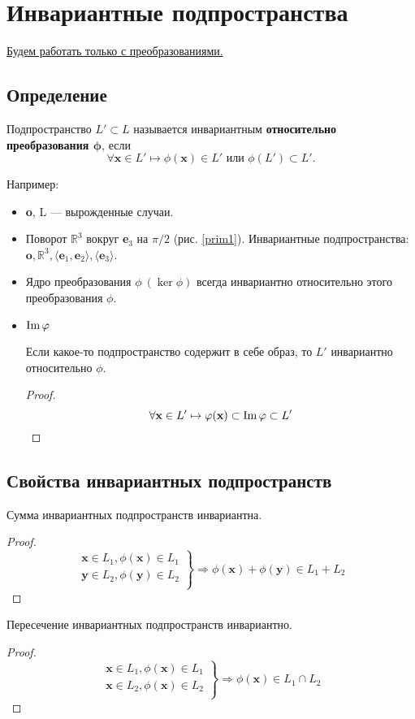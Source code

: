 \section{Инвариантные подпространства}
\underline{Будем работать только с преобразованиями.} %
\subsection{Определение}
\begin{definition}
Подпространство $L' \subset L$ называется \textsf{инвариантным} \textbf{относительно преобразования $\bm\phi$}, если
$$
\forall \textbf{x} \in L' \mapsto \phi(\textbf{x}) \in L'\text{ или }\phi(L')\subset L'.
$$
\end{definition}
Например:
\begin{itemize}
	\item \textbf{o}, L --- вырожденные случаи.
	\item Поворот $\mathbb{R}^3$ вокруг \textbf{e$_3$} на $\pi/2$ (рис. \ref{prim1}). Инвариантные подпространства: $\textbf{o}, \mathbb{R}^3, \langle \textbf{e$_1$}, \textbf{e$_2$} \rangle, \langle \textbf{e$_3$}\rangle$.
	\item Ядро преобразования $\phi \ (\ker \phi)$ всегда инвариантно относительно этого преобразования $\phi$.
	\item $\operatorname{\mathop{Im}} \varphi$
	\begin{theorem}
	Если какое-то подпространство содержит в себе образ, то $L'$ инвариантно относительно $\phi$.
	\end{theorem}
	\begin{proof}
		$$\forall \textbf{x} \in L' \mapsto \varphi(\textbf{x}) \subset \operatorname{\mathop{Im}}\varphi\subset L'$$
	\end{proof}
\end{itemize}
\subsection{Свойства инвариантных подпространств}
\begin{predlog}
	Сумма инвариантных подпространств инвариантна.
\end{predlog}
\begin{proof}
	$$
	\left.
	\begin{array}{r}
		\textbf{x} \in L_1, \phi(\textbf{x}) \in L_1\\
		\textbf{y} \in L_2, \phi(\textbf{y}) \in L_2\\
	\end{array}
	\right\} \Rightarrow \phi(\textbf{x}) + \phi(\textbf{y}) \in L_1 + L_2
	$$
\end{proof}
\begin{predlog}
	Пересечение инвариантных подпространств инвариантно.
\end{predlog}
\begin{proof}
	$$
	\left.
	\begin{array}{r}
	\textbf{x} \in L_1, \phi(\textbf{x}) \in L_1\\
	\textbf{x} \in L_2, \phi(\textbf{x}) \in L_2\\
	\end{array}
	\right\} \Rightarrow \phi(\textbf{x}) \in L_1 \cap L_2
	$$
\end{proof}
